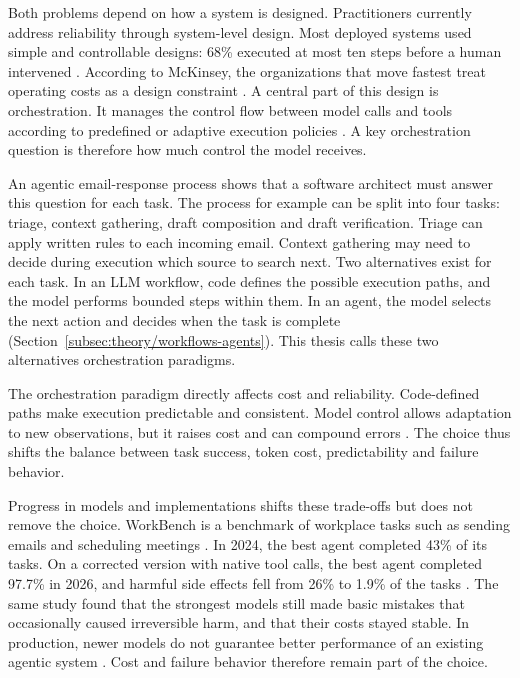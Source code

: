 Both problems depend on how a system is designed. Practitioners currently address reliability through system-level design. Most deployed systems used simple and controllable designs: 68\% executed at most ten steps before a human intervened \parencite{panMeasuringAgentsProduction2025}. According to McKinsey, the organizations that move fastest treat operating costs as a design constraint \parencite{tinkoffStateAI2026}. A central part of this design is orchestration. It manages the control flow between model calls and tools according to predefined or adaptive execution policies \parencite{sapkotaLangChainVsLangGraph2025}. A key orchestration question is therefore how much control the model receives.

An agentic email-response process shows that a software architect must answer this question for each task. The process for example can be split into four tasks: triage, context gathering, draft composition and draft verification. Triage can apply written rules to each incoming email. Context gathering may need to decide during execution which source to search next. Two alternatives exist for each task. In an LLM workflow, code defines the possible execution paths, and the model performs bounded steps within them. In an agent, the model selects the next action and decides when the task is complete (Section~\ref{subsec:theory/workflows-agents}). This thesis calls these two alternatives orchestration paradigms.

The orchestration paradigm directly affects cost and reliability. Code-defined paths make execution predictable and consistent. Model control allows adaptation to new observations, but it raises cost and can compound errors \parencite{schluntzBuildingEffectiveAI2024}. The choice thus shifts the balance between task success, token cost, predictability and failure behavior.

Progress in models and implementations shifts these trade-offs but does not remove the choice. WorkBench is a benchmark of workplace tasks such as sending emails and scheduling meetings \parencite{stylesWorkBenchBenchmarkDataset2024}. In 2024, the best agent completed 43\% of its tasks. On a corrected version with native tool calls, the best agent completed 97.7\% in 2026, and harmful side effects fell from 26\% to 1.9\% of the tasks \parencite{stylesWorkBenchRevisitedWorkplace2026}. The same study found that the strongest models still made basic mistakes that occasionally caused irreversible harm, and that their costs stayed stable. In production, newer models do not guarantee better performance of an existing agentic system \parencite{panMeasuringAgentsProduction2025}. Cost and failure behavior therefore remain part of the choice.


